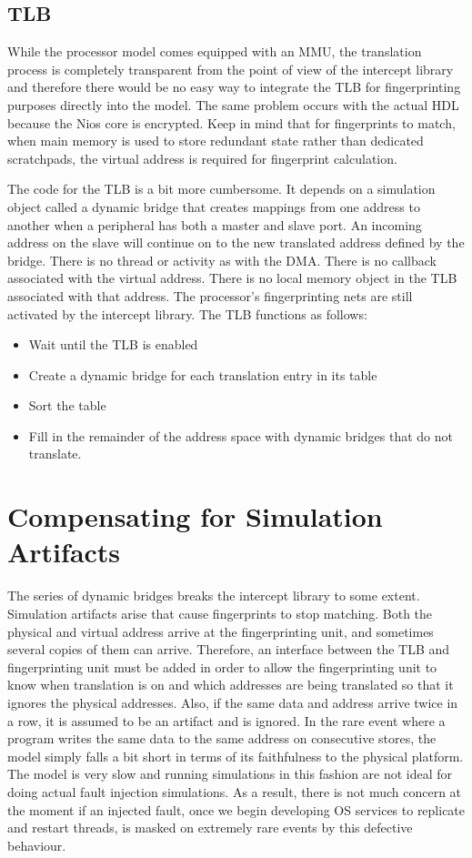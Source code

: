 \subsection{TLB}
While the processor model comes equipped with an MMU, the translation process is completely transparent from the point of view of the intercept library and therefore there would be no easy way to integrate the TLB for fingerprinting purposes directly into the model. The same problem occurs with the actual HDL because the Nios core is encrypted. Keep in mind that for fingerprints to match, when main memory is used to store redundant state rather than dedicated scratchpads, the virtual address is required for fingerprint calculation.

The code for the TLB is a bit more cumbersome. It depends on a simulation object called a dynamic bridge that creates mappings from one address to another when a peripheral has both a master and slave port. An incoming address on the slave will continue on to the new translated address defined by the bridge. There is no thread or activity as with the DMA. There is no callback associated with the virtual address. There is no local memory object in the TLB associated with that address. The processor's fingerprinting nets are still activated by the intercept library. The TLB functions as follows:
\begin{itemize}
\item Wait until the TLB is enabled
\item Create a dynamic bridge for each translation entry in its table
\item Sort the table
\item Fill in the remainder of the address space with dynamic bridges that do not translate.
\end{itemize}

\section{Compensating for Simulation Artifacts}

The series of dynamic bridges breaks the intercept library to some extent. Simulation artifacts arise that cause fingerprints to stop matching. Both the physical and virtual address arrive at the fingerprinting unit, and sometimes several copies of them can arrive. Therefore, an interface between the TLB and fingerprinting unit must be added in order to allow the fingerprinting unit to know when translation is on and which addresses are being translated so that it ignores the physical addresses. Also, if the same data and address arrive twice in a row, it is assumed to be an artifact and is ignored. In the rare event where a program writes the same data to the same address on consecutive stores, the model simply falls a bit short in terms of its faithfulness to the physical platform. The model is very slow and running simulations in this fashion are not ideal for doing actual fault injection simulations. As a result, there is not much concern at the moment if an injected fault, once we begin developing OS services to replicate and restart threads, is masked on extremely rare events by this defective behaviour. 


